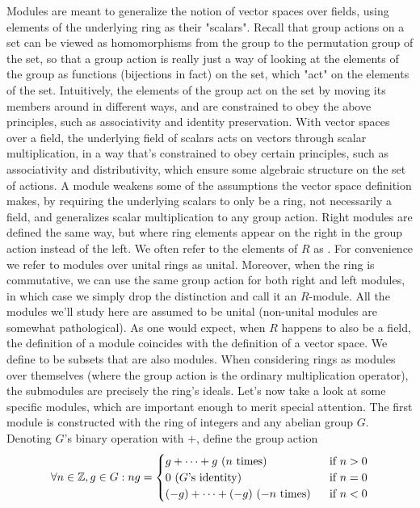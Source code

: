 \documentclass{article}
\begin{document}
\Mo Modules are meant to generalize the notion of vector spaces over fields, using elements of the underlying ring as their "scalars". Recall that group actions on a set can be viewed as homomorphisms from the group to the permutation group of the set, so that a group action is really just a way of looking at the elements of the group as functions (bijections in fact) on the set, which "act" on the elements of the set. Intuitively, the elements of the group act on the set by moving its members around in different ways, and are constrained to obey the above principles, such as associativity and identity preservation. With vector spaces over a field, the underlying field of scalars acts on vectors through scalar multiplication, in a way that's constrained to obey certain principles, such as associativity and distributivity, which ensure some algebraic structure on the set of actions. A module weakens some of the assumptions the vector space definition makes, by requiring the underlying scalars to only be a ring, not necessarily a field, and generalizes scalar multiplication to any group action.
\nn
Right modules are defined the same way, but where ring elements appear on the right in the group action instead of the left. We often refer to the elements of $ R $ as . For convenience we refer to modules over unital rings as unital. Moreover, when the ring is commutative, we can use the same group action for both right and left modules, in which case we simply drop the distinction and call it an $ R $-module. All the modules we'll study here are assumed to be unital (non-unital modules are somewhat pathological). As one would expect, when $ R $ happens to also be a field, the definition of a module coincides with the definition of a vector space. We define  to be subsets that are also modules. When considering rings as modules over themselves (where the group action is the ordinary multiplication operator), the submodules are precisely the ring's ideals.
\n
Let's now take a look at some specific modules, which are important enough to merit special attention. The first module is constructed with the ring of integers and any abelian group $ G $. Denoting $ G $'s binary operation with $ + $, define the group action
$$ \forall n \in \mathbb{Z}, g \in G: n g = \begin{cases}
    g + \cdots + g \text{ ($ n $ times) } &\text{ if } n > 0 \\
    0 \text{ ($ G $'s identity) } &\text{ if } n = 0 \\
    (- g) + \cdots + (- g) \text{ ($ - n $ times) } &\text{ if  } n < 0
\end{cases} $$
\end{document}
